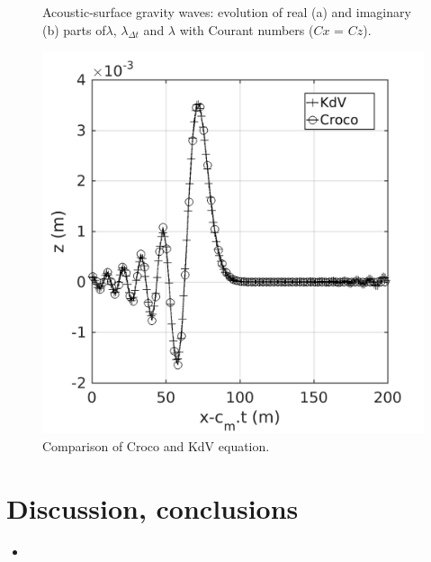 \documentclass[a4paper]{article}
\numberwithin{equation}{section}
\begin{document}
\begin{figure}[!ht]
   \centering
   \quad
   \caption{Acoustic-surface gravity waves: evolution of real (a) and imaginary (b) parts of$\lambda$, $\lambda_{\Delta t}$ and $\lambda$ with 
            Courant numbers ($Cx$ = $Cz$).}
   \label{FigLambdagravs}
\end{figure}

\begin{figure}[!ht]
   \centering
   \includegraphics[width=.4\textwidth]{FIGURES/kdv_plot.png}
   \caption{Comparison of Croco and KdV equation.}
   \label{KdV}
\end{figure}

\newpage

 
\newpage
\section{Discussion, conclusions}
 \begin{itemize}[font=\small] 
  \item 
 \end{itemize}
 
\newpage



\end{document}
